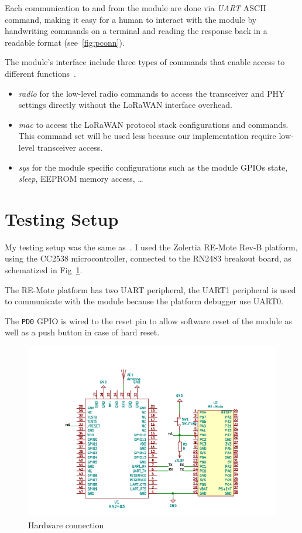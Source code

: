Each communication to and from the module are done via \emph{UART} ASCII command,
making it easy for a human to interact with the module by handwriting commands
on a terminal and reading the response back in a readable format
(see~\ref{fig:pconn}).



The module's interface include three types of commands that enable access to
different functions~\cite{microchip:reference}.

\begin{itemize}
  \item \emph{radio} for the low-level radio commands to access the transceiver
    and PHY settings directly without the LoRaWAN interface overhead.
  \item \emph{mac} to access the LoRaWAN protocol stack configurations and
    commands. This command set will be used less because our implementation require 
    low-level transceiver access.
  \item \emph{sys} for the module specific configurations such as the module
    GPIOs state, \emph{sleep}, EEPROM memory access, \ldots
\end{itemize}

\section{Testing Setup}

My testing setup was the same as~\cite{8847137}. I used the Zolertia RE-Mote
Rev-B platform, using the CC2538 microcontroller, connected to the
RN2483 breakout board, as schematized in Fig~\ref{fig:schemaconn}. 

The RE-Mote platform has two UART peripheral, the UART1 peripheral is used
to communicate with the module because the platform debugger use UART0.

The \lstinline{PD0} GPIO is wired to the reset pin to allow
software reset of the module as well as a push button in case of hard reset.

\begin{figure}[H]
  \centering
  \includegraphics[scale=0.70]{thesis.tex/chapters/driver/fig/conn_diag.pdf}
  \caption{Hardware connection\label{fig:schemaconn}}
\end{figure}

